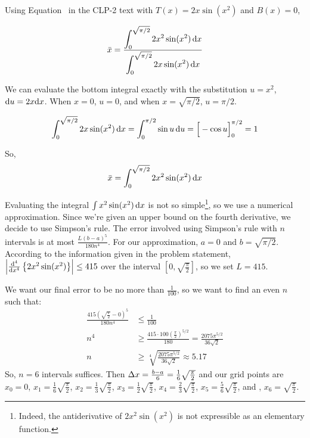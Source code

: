 \begin{solution}
Using Equation~ in the CLP-2 text with $T(x) = 2x\sin (x^2)$ and $B(x)=0$,

\[\bar x = \frac{\displaystyle\int_0^{\sqrt{\pi/2}} 2x^2\sin(x^2)\,\mathrm{d}x}{\displaystyle\int_0^{\sqrt{\pi/2}} 2x\sin(x^2)\,\mathrm{d}x}\]

We can evaluate the bottom integral exactly with the substitution $u=x^2$, $\mathrm{d}u=2x\mathrm{d}x$. When $x=0$, $u=0$, and when $x=\sqrt{\pi/2}$, $u=\pi/2$.

\begin{align*}
\int_0^{\sqrt{\pi/2}}2x\sin(x^2)\,\mathrm{d}x&=\int_0^{\pi/2} \sin u\,\mathrm{d}u
=\Big[-\cos u\Big]_0^{\pi/2}=1\\
\end{align*}

So, \[\bar x = \int_0^{\sqrt{\pi/2}} 2x^2\sin(x^2)\,\mathrm{d}x \]

Evaluating the integral $\int x^2\sin(x^2)\,\mathrm{d}x$ is not so simple\footnote{Indeed, the antiderivative of $2x^2\sin(x^2)$ is not expressible as an elementary function.}, so we use a numerical approximation. Since we're given an upper bound on the fourth derivative, we decide to use Simpson's rule. The error involved using Simpson's rule with $n$ intervals is at most $\frac{L(b-a)^5}{180n^4}$. For our approximation,  $a=0$ and $b=\sqrt{\pi/2}$. According to the information given in the problem statement,
$\left|\frac{\mathrm{d}^4}{\mathrm{d}{x}^4}\left\{2x^2\sin(x^2)\right\} \right| \leq 415$ over the interval $\left[0,\sqrt{\frac{\pi}{2}}\right]$, so  we set $L=415$.

We want our final error to be no more than $\frac{1}{100}$, so we want to find an even $n$ such that:
\begin{align*}
\frac{415\left(\sqrt{\frac{\pi}{2}}-0\right)^5}{180n^4} &\leq \frac{1}{100}\\
n^4 &\geq \frac{415\cdot 100\left(\frac{\pi}{2}\right)^{5/2}}{180} = \frac{2075\pi^{5/2}}{36\sqrt{2}}\\
n&\geq \sqrt[4]{\frac{2075\pi^{5/2}}{36\sqrt{2}}}\approx 5.17
\end{align*}
So, $n=6$ intervals suffices. Then $\Delta x = \frac{b-a}{6} = \frac{1}{6}\sqrt{\frac{\pi}{2}}$ and our grid points are $x_0=0$, $x_1=\frac{1}{6}\sqrt{\frac{\pi}{2}}$, $x_2=\frac{1}{3}\sqrt{\frac{\pi}{2}}$, $x_3=\frac{1}{2}\sqrt{\frac{\pi}{2}}$, $x_4=\frac{2}{3}\sqrt{\frac{\pi}{2}}$, $x_5=\frac{5}{6}\sqrt{\frac{\pi}{2}}$, and , $x_6=\sqrt{\frac{\pi}{2}}$.


\end{solution}
